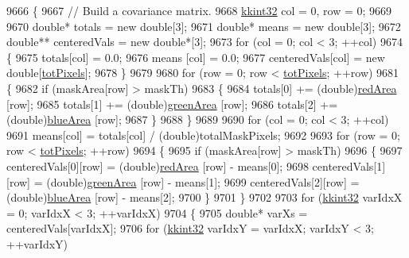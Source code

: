 \begin{DoxyCode}
9666   \{
9667     \textcolor{comment}{// Build a covariance matrix.}
9668     \hyperlink{namespace_k_k_b_a8fa4952cc84fda1de4bec1fbdd8d5b1b}{kkint32}  col = 0, row = 0;
9669 
9670     \textcolor{keywordtype}{double}*   totals       = \textcolor{keyword}{new} \textcolor{keywordtype}{double}[3];
9671     \textcolor{keywordtype}{double}*   means        = \textcolor{keyword}{new} \textcolor{keywordtype}{double}[3];
9672     \textcolor{keywordtype}{double}**  centeredVals = \textcolor{keyword}{new} \textcolor{keywordtype}{double}*[3];
9673     \textcolor{keywordflow}{for}  (col = 0;  col < 3;  ++col)
9674     \{
9675       totals[col] = 0.0;
9676       means [col] = 0.0;
9677       centeredVals[col] = \textcolor{keyword}{new} \textcolor{keywordtype}{double}[\hyperlink{class_k_k_b_1_1_raster_a9b08c4a0ca0a35435a478599635f1dc0}{totPixels}];
9678     \}
9679 
9680     \textcolor{keywordflow}{for}  (row = 0;  row < \hyperlink{class_k_k_b_1_1_raster_a9b08c4a0ca0a35435a478599635f1dc0}{totPixels};  ++row)
9681     \{
9682       \textcolor{keywordflow}{if}  (maskArea[row] > maskTh)
9683       \{
9684         totals[0] += (double)\hyperlink{class_k_k_b_1_1_raster_aaef16f7d4dc7c8b99e84176d0babd731}{redArea}   [row];
9685         totals[1] += (double)\hyperlink{class_k_k_b_1_1_raster_ad981258f1f7284a8bd0cd0466f328cdf}{greenArea} [row];
9686         totals[2] += (double)\hyperlink{class_k_k_b_1_1_raster_af7996dfe61613e5ecf91454175bfe3f1}{blueArea}  [row];
9687       \}
9688     \}
9689 
9690     \textcolor{keywordflow}{for}  (col = 0;  col < 3;  ++col)
9691       means[col] = totals[col] / (\textcolor{keywordtype}{double})totalMaskPixels;
9692 
9693     \textcolor{keywordflow}{for}  (row = 0;  row < \hyperlink{class_k_k_b_1_1_raster_a9b08c4a0ca0a35435a478599635f1dc0}{totPixels};  ++row)
9694     \{
9695       \textcolor{keywordflow}{if}  (maskArea[row] > maskTh)
9696       \{
9697         centeredVals[0][row] = (double)\hyperlink{class_k_k_b_1_1_raster_aaef16f7d4dc7c8b99e84176d0babd731}{redArea}   [row] - means[0];
9698         centeredVals[1][row] = (double)\hyperlink{class_k_k_b_1_1_raster_ad981258f1f7284a8bd0cd0466f328cdf}{greenArea} [row] - means[1];
9699         centeredVals[2][row] = (double)\hyperlink{class_k_k_b_1_1_raster_af7996dfe61613e5ecf91454175bfe3f1}{blueArea}  [row] - means[2];
9700       \}
9701     \}
9702  
9703     \textcolor{keywordflow}{for}  (\hyperlink{namespace_k_k_b_a8fa4952cc84fda1de4bec1fbdd8d5b1b}{kkint32} varIdxX = 0;  varIdxX < 3;  ++varIdxX)
9704     \{
9705       \textcolor{keywordtype}{double}*  varXs = centeredVals[varIdxX];
9706       \textcolor{keywordflow}{for}  (\hyperlink{namespace_k_k_b_a8fa4952cc84fda1de4bec1fbdd8d5b1b}{kkint32} varIdxY = varIdxX;  varIdxY < 3;  ++varIdxY)

\end{DoxyCode}
